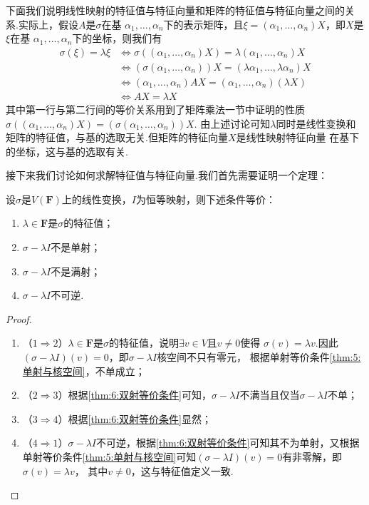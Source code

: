 下面我们说明线性映射的特征值与特征向量和矩阵的特征值与特征向量之间的关系.实际上，假设$A$是$\sigma$在基
$\alpha_1,\ldots,\alpha_n$下的表示矩阵，且$\xi=(\alpha_1,\ldots,\alpha_n)X$，即$X$是$\xi$在基
$\alpha_1,\ldots,\alpha_n$下的坐标，则我们有
\begin{align*}
    \sigma(\xi)=\lambda\xi &\iff \sigma((\alpha_1,\ldots,\alpha_n)X)=\lambda(\alpha_1,\ldots,\alpha_n)X \\
                           &\iff (\sigma(\alpha_1,\ldots,\alpha_n))X=(\lambda\alpha_1,\ldots,\lambda\alpha_n)X \\
                           &\iff (\alpha_1,\ldots,\alpha_n)AX=(\alpha_1,\ldots,\alpha_n)(\lambda X) \\
                           &\iff AX=\lambda X
\end{align*}
其中第一行与第二行间的等价关系用到了矩阵乘法一节中证明的性质
$\sigma((\alpha_1,\ldots,\alpha_n)X)=(\sigma(\alpha_1,\ldots,\alpha_n))X$.
由上述讨论可知$\lambda$同时是线性变换和矩阵的特征值，与基的选取无关.但矩阵的特征向量$X$是线性映射特征向量
在基下的坐标，这与基的选取有关.

接下来我们讨论如何求解特征值与特征向量.我们首先需要证明一个定理：
\begin{theorem}
    设$\sigma$是$V(\mathbf{F})$上的线性变换，$I$为恒等映射，则下述条件等价：
    \begin{enumerate}[label=(\arabic*)]
        \item $\lambda\in\mathbf{F}$是$\sigma$的特征值；
        \item $\sigma-\lambda I$不是单射；
        \item $\sigma-\lambda I$不是满射；
        \item $\sigma-\lambda I$不可逆.
    \end{enumerate}
\end{theorem}
\begin{proof}
    \begin{enumerate}[label=(\arabic*)]
        \item （$1\Rightarrow 2$）$\lambda\in\mathbf{F}$是$\sigma$的特征值，说明$\exists v\in V$且$v\neq 0$使得
        $\sigma(v)=\lambda v$.因此$(\sigma-\lambda I)(v)=0$，即$\sigma-\lambda I$核空间不只有零元，
        根据单射等价条件\autoref{thm:5:单射与核空间}，不单成立；
        \item （$2\Rightarrow 3$）根据\autoref{thm:6:双射等价条件}可知，$\sigma-\lambda I$不满当且仅当$\sigma-\lambda I$不单；
        \item （$3\Rightarrow 4$）根据\autoref{thm:6:双射等价条件}显然；
        \item （$4\Rightarrow 1$）$\sigma-\lambda I$不可逆，根据\autoref{thm:6:双射等价条件}可知其不为单射，又根据
        单射等价条件\autoref{thm:5:单射与核空间}可知$(\sigma-\lambda I)(v)=0$有非零解，即$\sigma(v)=\lambda v$，
        其中$v\neq 0$，这与特征值定义一致.
    \end{enumerate}
\end{proof}

